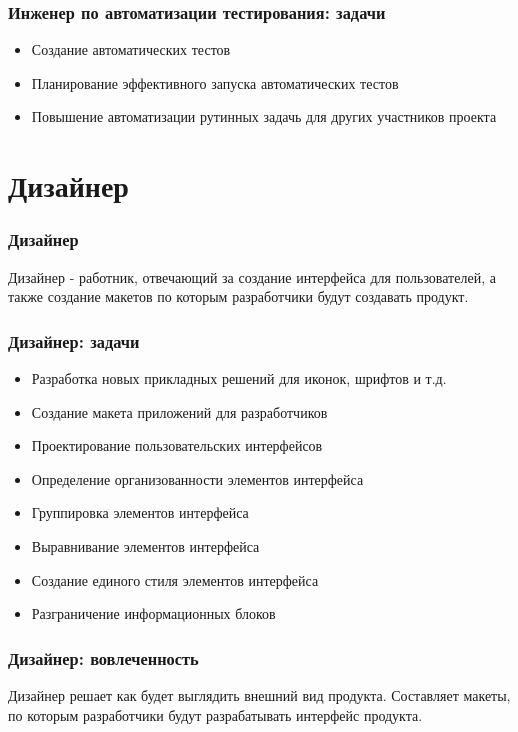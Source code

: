 \documentclass{../industrial-development}
\begin{document}
	\begin{frame} \frametitle{Инженер по автоматизации тестирования: задачи}
		\begin{itemize}
			\item Создание автоматических тестов
			\item Планирование эффективного запуска автоматических тестов
			\item Повышение автоматизации рутинных задачь для других участников проекта		
		\end{itemize}
	\end{frame}
	
	\section{Дизайнер }
	
	\begin{frame} \frametitle{Дизайнер}
		\begin{block}{}
			\alert {Дизайнер} - работник, отвечающий за создание интерфейса для пользователей, а также создание макетов по которым разработчики будут создавать продукт.
		\end{block}
		
	\end{frame}
	
	\begin{frame} \frametitle{Дизайнер: задачи}
		\begin{itemize}
			\item Разработка новых прикладных решений для иконок, шрифтов и т.д.
			\item Создание макета приложений для разработчиков
			\item Проектирование пользовательских интерфейсов
			\item Определение организованности элементов интерфейса
			\item Группировка элементов интерфейса
			\item Выравнивание элементов интерфейса
			\item Создание единого стиля элементов интерфейса
			\item Разграничение информационных блоков
		\end{itemize}
	\end{frame}
	
	\begin{frame} \frametitle{Дизайнер: вовлеченность}
		Дизайнер решает как будет выглядить внешний вид продукта. Составляет макеты, по которым разработчики будут разрабатывать интерфейс продукта.
	\end{frame}
	
\end{document}
